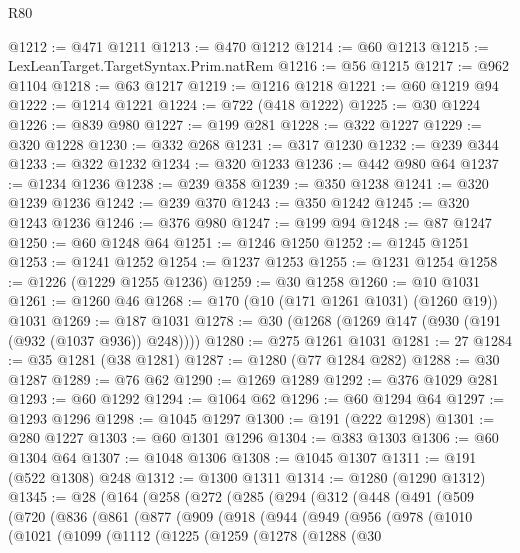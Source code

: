 \begin{lexlean}{R80}
\begin{coremodule}
@1212 := @471 @1211
@1213 := @470 @1212
@1214 := @60 @1213
@1215 := LexLeanTarget.TargetSyntax.Prim.natRem
@1216 := @56 @1215
@1217 := @962 @1104
@1218 := @63 @1217
@1219 := @1216 @1218
@1221 := @60 @1219 @94
@1222 := @1214 @1221
@1224 := @722 (@418 @1222)
@1225 := @30 @1224
@1226 := @839 @980
@1227 := @199 @281
@1228 := @322 @1227
@1229 := @320 @1228
@1230 := @332 @268
@1231 := @317 @1230
@1232 := @239 @344
@1233 := @322 @1232
@1234 := @320 @1233
@1236 := @442 @980 @64
@1237 := @1234 @1236
@1238 := @239 @358
@1239 := @350 @1238
@1241 := @320 @1239 @1236
@1242 := @239 @370
@1243 := @350 @1242
@1245 := @320 @1243 @1236
@1246 := @376 @980
@1247 := @199 @94
@1248 := @87 @1247
@1250 := @60 @1248 @64
@1251 := @1246 @1250
@1252 := @1245 @1251
@1253 := @1241 @1252
@1254 := @1237 @1253
@1255 := @1231 @1254
@1258 := @1226 (@1229 @1255 @1236)
@1259 := @30 @1258
@1260 := @10 @1031
@1261 := @1260 @46
@1268 := @170 (@10 (@171 @1261 @1031) (@1260 @19)) @1031
@1269 := @187 @1031
@1278 := @30 (@1268 (@1269 @147 (@930 (@191 (@932 (@1037 @936)) @248))))
@1280 := @275 @1261 @1031
@1281 := 27
@1284 := @35 @1281 (@38 @1281)
@1287 := @1280 (@77 @1284 @282)
@1288 := @30 @1287
@1289 := @76 @62
@1290 := @1269 @1289
@1292 := @376 @1029 @281
@1293 := @60 @1292
@1294 := @1064 @62
@1296 := @60 @1294 @64
@1297 := @1293 @1296
@1298 := @1045 @1297
@1300 := @191 (@222 @1298)
@1301 := @280 @1227
@1303 := @60 @1301 @1296
@1304 := @383 @1303
@1306 := @60 @1304 @64
@1307 := @1048 @1306
@1308 := @1045 @1307
@1311 := @191 (@522 @1308) @248
@1312 := @1300 @1311
@1314 := @1280 (@1290 @1312)
@1345 := @28
    (@164
      (@258
        (@272
          (@285
            (@294
              (@312
                (@448
                  (@491
                    (@509
                      (@720
                        (@836
                          (@861
                            (@877
                              (@909
                                (@918
                                  (@944
                                    (@949
                                      (@956
                                        (@978
                                          (@1010
                                            (@1021
                                              (@1099
                                                (@1112
                                                  (@1225
                                                    (@1259
                                                      (@1278
                                                        (@1288
                                                          (@30

\end{coremodule}
\end{lexlean}
